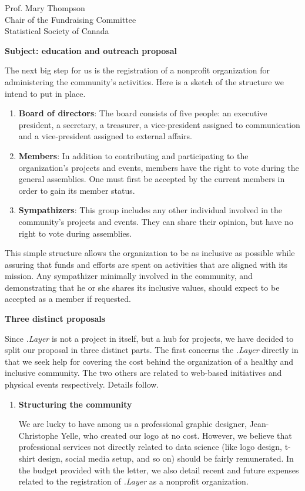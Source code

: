 \documentclass[11pt, a4paper]{letter} %
\begin{document}
\begin{letter}{
	Prof. Mary Thompson\\
	Chair of the Fundraising Committee\\
	Statistical Society of Canada
	
	\bigskip
	\textbf{Subject: education and outreach proposal}%
}
The next big step for us is the registration of a nonprofit organization for administering the community's activities. Here is a sketch of the structure we intend to put in place.

\begin{enumerate}
	\item[] \textbf{Board of directors}: The board consists of five people: an executive president, a secretary, a treasurer, a vice-president assigned to communication and a vice-president assigned to external affairs.
	\item[] \textbf{Members}: In addition to contributing and participating to the organization's projects and events, members have the right to vote during the general assemblies. One must first be accepted by the current members in order to gain its member status.
	\item[] \textbf{Sympathizers}: This group includes any other individual involved in the community's projects and events. They can share their opinion, but have no right to vote during assemblies.
\end{enumerate}

This simple structure allows the organization to be as inclusive as possible while assuring that funds and efforts are spent on activities that are aligned with its mission. Any sympathizer minimally involved in the community, and demonstrating that he or she shares its inclusive values, should expect to be accepted as a member if requested.

\pagebreak

\noindent \textbf{Three distinct proposals}

Since \emph{.Layer} is not a project in itself, but a hub for projects, we have decided to split our proposal in three distinct parts. The first concerns the \emph{.Layer} directly in that we seek help for covering the cost behind the organization of a healthy and inclusive community. The two others are related to web-based initiatives and physical events respectively. Details follow.

\begin{enumerate}
	\item \textbf{Structuring the community}
	
	\quad We are lucky to have among us a professional graphic designer, Jean-Christophe Yelle, who created our logo at no cost. However, we believe that professional services not directly related to data science (like logo design, t-shirt design, social media setup, and so on) should be fairly remunerated. In the budget provided with the letter, we also detail recent and future expenses related to the registration of \emph{.Layer} as a nonprofit organization.
	

\end{enumerate}
\end{letter}
\end{document}
